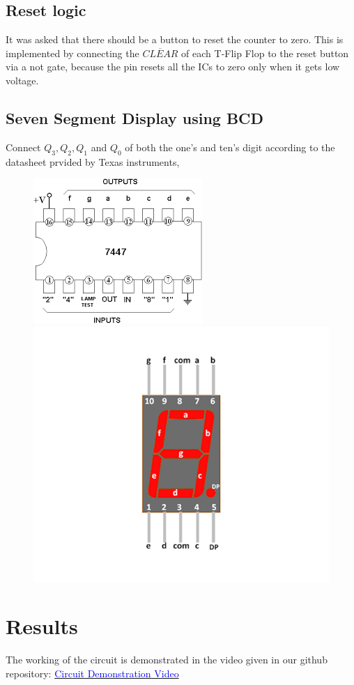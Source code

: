 \documentclass[a4paper,12pt]{article}
\begin{document}
\subsection*{Reset logic}
It was asked that there should be a button to reset the counter to zero. This is implemented by connecting the $\overline{CLEAR}$ of each T-Flip Flop to the reset button via a not gate, because
the pin resets all the ICs to zero only when it gets low voltage.
\subsection*{Seven Segment Display using BCD}
Connect $Q_3, Q_2, Q_1$ and $Q_0$ of both the one's and ten's digit according to the datasheet prvided by Texas instruments,
\begin{figure}[H]
  {\includegraphics[width=0.5\linewidth]{bcd.png}}
  \hspace{\hfill}
  {\includegraphics[width=0.5\linewidth]{7seg.png}}
\end{figure}
\section*{Results}
The working of the circuit is demonstrated in the video given in our github repository:
\newline
\href{https://github.com/AdityaTripathyIIT/ee1200-submissions/blob/main/exp8/circuit_video.mp4}{\textcolor{blue}{Circuit Demonstration Video}}
\end{document}
